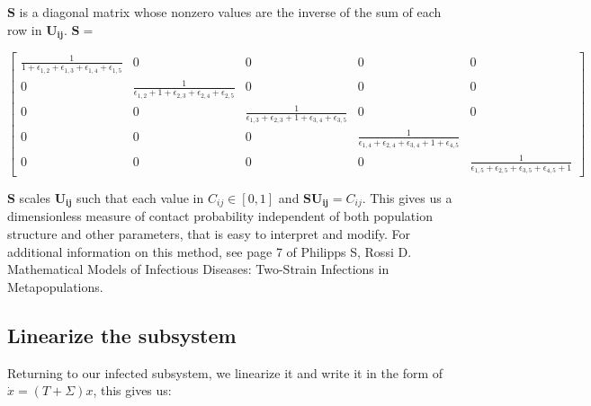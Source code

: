 \documentclass{article}
\begin{document}
$\boldsymbol{S}$ is a diagonal matrix whose nonzero values are the inverse of the sum of each row in $\boldsymbol{U_{ij}}$. $\boldsymbol{S} =$ 


\noindent
\[
\begin{bmatrix}
\frac{1}{1+\epsilon_{1,2}+\epsilon_{1,3}+\epsilon_{1,4}+\epsilon_{1,5}} & 0 & 0 & 0 & 0 \\
0 & \frac{1}{\epsilon_{1,2} + 1 + \epsilon_{2,3} + \epsilon_{2,4} + \epsilon_{2,5}} & 0 & 0 & 0 \\
0 & 0 & \frac{1}{\epsilon_{1,3}+\epsilon_{2,3}+1+\epsilon_{3,4}+\epsilon_{3,5}} & 0 & 0 \\
0 & 0 & 0 & \frac{1}{\epsilon_{1,4}+\epsilon_{2,4}+\epsilon_{3,4}+1+\epsilon_{4,5}} \\
0 & 0 & 0 & 0 & \frac{1}{\epsilon_{1,5}+\epsilon_{2,5}+\epsilon_{3,5}+\epsilon_{4,5}+1} 
   \end{bmatrix}
\]


$\boldsymbol{S}$ scales $\boldsymbol{U_{ij}}$ such that each value in $C_{ij} \in [0,1]$ and $\boldsymbol{S}\boldsymbol{U_{ij}}=C_{ij}$. This gives us a dimensionless measure of contact probability independent of both population structure and other parameters, that is easy to interpret and modify. For additional information on this method, see page 7 of Philipps S, Rossi D. Mathematical Models of Infectious Diseases: Two-Strain Infections in Metapopulations.\\

\subsection*{Linearize the subsystem}

Returning to our infected subsystem, we linearize it and write it in the form of $\dot{x} = (T + \Sigma) x$, this gives us:
\end{document}
